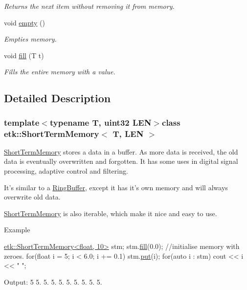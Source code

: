 \begin{DoxyCompactItemize}
\begin{DoxyCompactList}\small\item\em Returns the next item without removing it from memory. \end{DoxyCompactList}\item 
\hypertarget{classetk_1_1_short_term_memory_a7a8b7aa0f74d5163b304b03f27dc7fed}{void \hyperlink{classetk_1_1_short_term_memory_a7a8b7aa0f74d5163b304b03f27dc7fed}{empty} ()}\label{classetk_1_1_short_term_memory_a7a8b7aa0f74d5163b304b03f27dc7fed}

\begin{DoxyCompactList}\small\item\em Empties memory. \end{DoxyCompactList}\item 
\hypertarget{classetk_1_1_short_term_memory_a69bbdd78237057d731fea8895d2df7e8}{void \hyperlink{classetk_1_1_short_term_memory_a69bbdd78237057d731fea8895d2df7e8}{fill} (T t)}\label{classetk_1_1_short_term_memory_a69bbdd78237057d731fea8895d2df7e8}

\begin{DoxyCompactList}\small\item\em Fills the entire memory with a value. \end{DoxyCompactList}\end{DoxyCompactItemize}


\subsection{Detailed Description}
\subsubsection*{template$<$typename T, uint32 L\-E\-N$>$class etk\-::\-Short\-Term\-Memory$<$ T, L\-E\-N $>$}

\hyperlink{classetk_1_1_short_term_memory}{Short\-Term\-Memory} stores a data in a buffer. As more data is received, the old data is eventually overwritten and forgotten. It has some uses in digital signal processing, adaptive control and filtering. 

It's similar to a \hyperlink{classetk_1_1_ring_buffer}{Ring\-Buffer}, except it has it's own memory and will always overwrite old data.

\hyperlink{classetk_1_1_short_term_memory}{Short\-Term\-Memory} is also iterable, which make it nice and easy to use.

Example 
\begin{DoxyCode}
\hyperlink{classetk_1_1_short_term_memory}{etk::ShortTermMemory<float, 10>} stm;
stm.\hyperlink{classetk_1_1_short_term_memory_a69bbdd78237057d731fea8895d2df7e8}{fill}(0.0); \textcolor{comment}{//initialise memory with zeroes.}
\textcolor{keywordflow}{for}(\textcolor{keywordtype}{float} i = 5; i < 6.0; i += 0.1)
    stm.\hyperlink{classetk_1_1_short_term_memory_a960b35e4870eba7f21446816b0762357}{put}(i);
\textcolor{keywordflow}{for}(\textcolor{keyword}{auto} i : stm)
    cout << i << \textcolor{stringliteral}{" "};
\end{DoxyCode}
 Output\-: 5 5. 5. 5. 5. 5. 5. 5. 5. 5.


